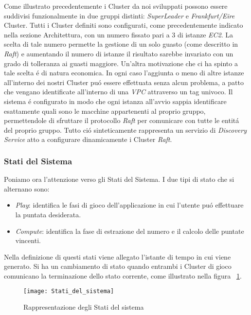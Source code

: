 \documentclass{sig-alternate-05-2015}
\begin{document}
Come illustrato precedentemente i Cluster da noi sviluppati possono essere suddivisi funzionalmente in due gruppi distinti: \textit{SuperLeader} e \textit{Frankfurt/Eire} Cluster.
Tutti i Cluster definiti sono configurati, come precedentemente indicato nella sezione Architettura, con un numero fissato pari a 3 di istanze \textit{EC2}.
La scelta di tale numero permette la gestione di un solo guasto (come descritto in \textit{Raft}) e aumentando il numero di istanze il risultato sarebbe invariato con un grado di tolleranza ai guasti maggiore.
Un'altra motivazione che ci ha spinto a tale scelta \'e di natura economica.
In ogni caso l'aggiunta o meno di altre istanze all'interno dei nostri Cluster pu\'o essere effettuata senza alcun problema, a patto che vengano identificate all'interno di una \textit{VPC} attraverso un tag univoco. Il sistema \'e configurato in modo che ogni istanza all'avvio sappia identificare esattamente quali sono le macchine appartenenti al proprio gruppo, permettendole di sfruttare il protocollo \textit{Raft} per comunicare con tutte le entit\'a del proprio gruppo.
Tutto ci\'o sinteticamente rappresenta un servizio di \textit{Discovery Service} atto a configurare dinamicamente i Cluster \textit{Raft}.

\subsubsection{Stati del Sistema}


Poniamo ora l'attenzione verso gli Stati del Sistema.
I due tipi di stato che si alternano sono:
\begin{itemize}
\item \textit{Play}: identifica le fasi di gioco dell'applicazione in cui l'utente pu\'o effettuare la puntata desiderata.
\item \textit{Compute}: identifica la fase di estrazione del numero e il calcolo delle puntate vincenti.
\end{itemize}
Nella definizione di questi stati viene allegato l'istante di tempo in cui viene generato.
Si ha un cambiamento di stato quando entrambi i Cluster di gioco comunicano la terminazione dello stato corrente, come illustrato nella figura ~\ref{fig:stateSystem}.

\begin{figure}\centering
 \texttt{[image: Stati\_del\_sistema]} 
 \caption{Rappresentazione degli Stati del sistema} 
\label{fig:stateSystem}
 \end{figure}
\end{document}
